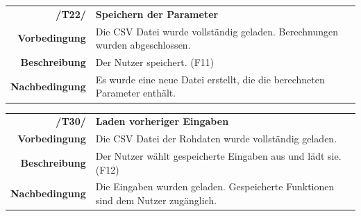 \documentclass{article}
\begin{document}
\begin{table}[H]
\begin{tabularx}{\textwidth}{rX}
\textbf{/T22/}         & \textbf{Speichern der Parameter} \\
\textbf{Vorbedingung}  & Die CSV Datei wurde vollständig geladen. Berechnungen wurden abgeschlossen.   \\
\textbf{Beschreibung}  & Der Nutzer speichert. (F11) \\
\textbf{Nachbedingung} & Es wurde eine neue Datei erstellt, die die berechneten Parameter enthält.
\end{tabularx}
\end{table}

\begin{table}[H]
\begin{tabularx}{\textwidth}{rX}
\textbf{/T30/}         & \textbf{Laden vorheriger Eingaben} \\
\textbf{Vorbedingung}  & Die CSV Datei der Rohdaten wurde vollständig geladen.   \\
\textbf{Beschreibung}  & Der Nutzer wählt gespeicherte Eingaben aus und lädt sie. (F12) \\
\textbf{Nachbedingung} & Die Eingaben wurden geladen. Gespeicherte Funktionen sind dem Nutzer zugänglich. 
\end{tabularx}
\end{table}
\end{document}
